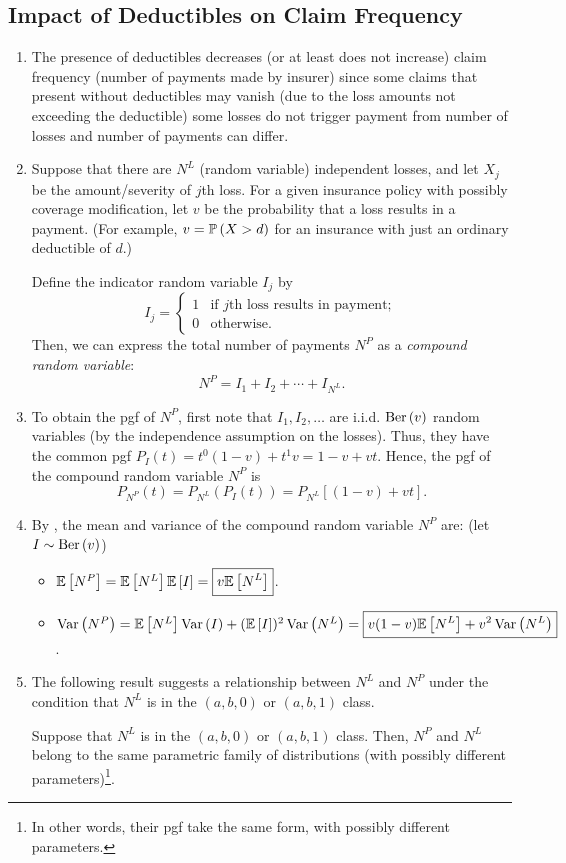 \subsection{Impact of Deductibles on Claim Frequency}
\begin{enumerate}
\item The presence of deductibles decreases (or at least does not increase)
claim frequency (number of payments made by insurer) since some claims that
present without deductibles may vanish (due to the loss amounts not exceeding
the deductible)  some losses do not trigger payment from
  number of losses and number of payments
can differ.

\item Suppose that there are \(N^L\) (random variable) independent losses, and
let \(X_j\) be the amount/severity of \(j\)th loss. For a given insurance
policy with possibly coverage modification, let \(v\) be the probability that a
loss results in a payment. (For example, \(v=\mathbb{P}\left(X>d\right)\) for an insurance with
just an ordinary deductible of \(d\).)

Define the indicator random variable \(I_j\) by
\[
I_j=\begin{cases}
1&\text{if \(j\)th loss results in payment};\\
0&\text{otherwise}.
\end{cases}
\]
Then, we can express the total number of payments \(N^P\) as a \emph{compound
random variable}:
\[
N^P=I_1+I_2+\dotsb+I_{N^L}.
\]

\item \label{it:ded-payment-num-pgf}
To obtain the pgf of \(N^P\), first note that \(I_1,I_2,\dotsc\) are i.i.d.
\(\operatorname{Ber}\left(v\right)\) random variables (by the independence assumption on the losses).
Thus, they have the common pgf \(P_I(t)=t^0(1-v)+t^1v=1-v+vt\). Hence, the pgf
of the compound random variable \(N^P\) is
\[
P_{N^P}(t)=P_{N^L}(P_I(t))=\boxed{P_{N^L}[(1-v)+vt]}.
\]

\item \label{it:np-mean-var}
By , the mean and variance of the compound
random variable \(N^P\) are: (let \(I\sim\operatorname{Ber}\left(v\right)\))
\begin{itemize}
\item \(\mathbb{E}\left[N^P\right]=\mathbb{E}\left[N^L\right]\mathbb{E}\left[I\right]=\boxed{v\mathbb{E}\left[N^L\right]}\).
\item \(\operatorname{Var}\left(N^P\right)=\mathbb{E}\left[N^L\right]\operatorname{Var}\left(I\right)+(\mathbb{E}\left[I\right])^2\operatorname{Var}\left(N^L\right)=\boxed{v(1-v)\mathbb{E}\left[N^L\right]+v^2\operatorname{Var}\left(N^L\right)}\).
\end{itemize}

\item The following result suggests a relationship between \(N^L\) and \(N^P\)
under the condition that \(N^L\) is in the \((a,b,0)\) or \((a,b,1)\) class.
\begin{theorem}
\label{thm:ab01-nl-np-same-family}
Suppose that \(N^L\) is in the \((a,b,0)\) or \((a,b,1)\) class. Then, \(N^P\)
and \(N^L\) belong to the same parametric family of distributions (with
possibly different parameters)\footnote{In other words, their pgf take the same
form, with possibly different parameters.}.
\end{theorem}
\end{enumerate}
